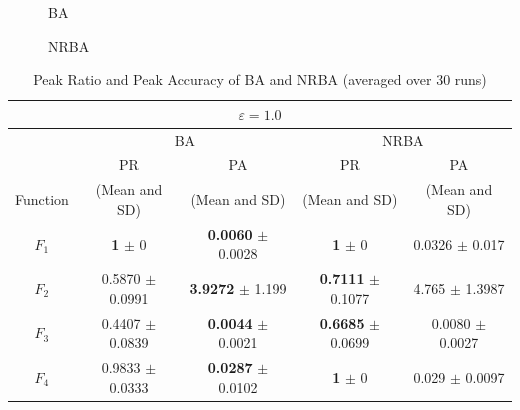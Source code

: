 \documentclass[conference]{IEEEtran}
\begin{document}
\begin{figure}[h]
{	\label{fig:f3_ba}
}
\caption{BA}
\label{fig:results_ba}
\end{figure}

\begin{figure}[h]
\centering
{}
\caption{NRBA}
\label{fig:results_nrba}

\end{figure}

\begin{table}[h]
\caption{Peak Ratio and Peak Accuracy of BA and NRBA (averaged over 30 runs)}
\begin{center}
\begin{tabular}{c|c|c|c|c}
\multicolumn{5}{c}{$\varepsilon = 1.0$} \\
\hline
\multicolumn{1}{c|}{} & \multicolumn{2}{c|}{BA} & \multicolumn{2}{c}{NRBA} \\
\hline
 & PR & PA & PR & PA \\

Function & (Mean and SD) & (Mean and SD) & (Mean and SD) & (Mean and SD) \\
\hline
$F_1 $ & {\bf 1} $\pm$ 0 & {\bf 0.0060} $\pm$ 0.0028 & {\bf 1} $\pm$ 0  & 0.0326 $\pm$ 0.017  \\
\hline
$F_2 $ & 0.5870 $\pm$ 0.0991 & {\bf 3.9272} $\pm$ 1.199 & {\bf 0.7111} $\pm$ 0.1077 & 4.765 $\pm$ 1.3987 \\
\hline
$F_3 $ & 0.4407 $\pm$ 0.0839 & {\bf 0.0044} $\pm$ 0.0021 & {\bf 0.6685} $\pm$ 0.0699 & 0.0080 $\pm$ 0.0027 \\
\hline
$F_4 $ & 0.9833 $\pm$ 0.0333  & {\bf 0.0287} $\pm$ 0.0102 & {\bf 1} $\pm$ 0 & 0.029 $\pm$ 0.0097 \\
\hline
\end{tabular}
\label{tab2}
\end{center}
\end{table}
\end{document}
